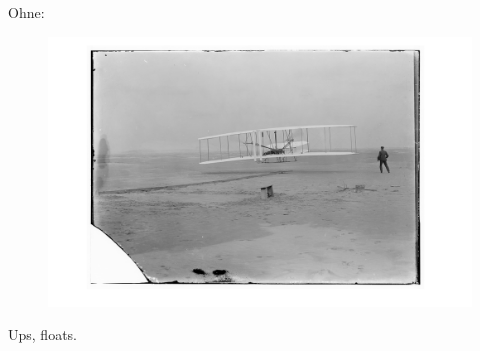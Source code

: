 \documentclass[a4paper]{amsart}
\begin{document}
\begin{figure}
\begin{subfigure}[b]{0.3\textwidth}
    \end{subfigure}
\end{figure}

Ohne:
\begin{figure}
    \includegraphics[width=\textwidth]{bild.png}
\end{figure}

Ups, floats.
\end{document}
